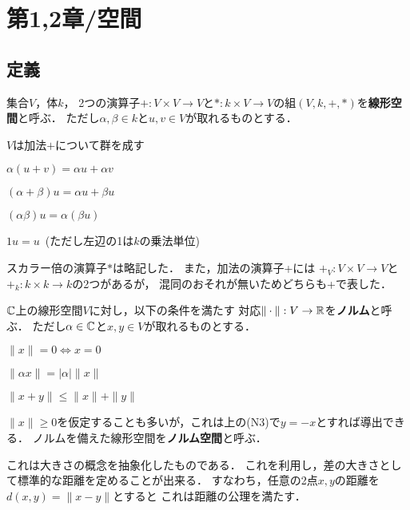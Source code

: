 \documentclass[a4j]{jarticle}
\begin{document}
    \section{第1,2章/空間}
    \subsection{定義}
        \begin{Def}
            集合$V$，体$k$，
            2つの演算子$+:V \times V \to V$と$\ast: k \times V \to V$の組$(V,k,+,\ast)$を\textbf{線形空間}と呼ぶ．
            ただし$\alpha, \beta \in k$と$u,v \in V$が取れるものとする．
            \begin{description}
                \setlength{\leftskip}{0.5truecm}
                \item[V1] $V$は加法$+$について群を成す
                \item[V2] $\alpha(u+v)=\alpha u+\alpha v$
                \item[V3] $(\alpha+\beta)u=\alpha u+\beta u$
                \item[V4] $(\alpha \beta)u=\alpha (\beta u)$
                \item[V5] $1 u=u$~(ただし左辺の1は$k$の乗法単位)
            \end{description}
            スカラー倍の演算子$\ast$は略記した．
            また，加法の演算子+には
            $+_{V}:V \times V \to V$と$+_{k}: k \times k \to k$の2つがあるが，
            混同のおそれが無いためどちらも+で表した．
        \end{Def}

        \begin{Def}
            $\mathbb{C}$上の線形空間$V$に対し，以下の条件を満たす
            対応$\| \cdot \|: V \to \mathbb{R} $を\textbf{ノルム}と呼ぶ．
            ただし$\alpha \in \mathbb{C}$と$x, y \in V$が取れるものとする．
            \begin{description}
                \setlength{\leftskip}{0.5truecm}
                \item[N1] $\|x\|=0 \iff x=0$
                \item[N2] $\|\alpha x\| =|\alpha| \|x\|$
                \item[N3] $\|x+y\| \leq \|x\|+\|y\|$
            \end{description}
            $\|x\| \geq 0$を仮定することも多いが，これは上の(N3)で$y=-x$とすれば導出できる．
            ノルムを備えた線形空間を\textbf{ノルム空間}と呼ぶ．
        \end{Def}
        これは大きさの概念を抽象化したものである．
        これを利用し，差の大きさとして標準的な距離を定めることが出来る．
        すなわち，任意の2点$x,y$の距離を$d(x,y)=\|x-y\|$とすると
        これは距離の公理を満たす．
\end{document}
